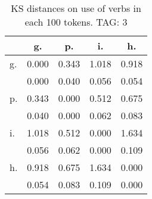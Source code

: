 \begin{table}[h!]
\begin{center}
\begin{tabular}{| l | c | c | c | c |}\hline
 & g. & p. & i. & h. \\\hline
g. & 0.000  & 0.343  & 1.018  & 0.918 \\\hline
 & 0.000  & 0.040  & 0.056  & 0.054 \\\hline
p. & 0.343  & 0.000  & 0.512  & 0.675 \\\hline
 & 0.040  & 0.000  & 0.062  & 0.083 \\\hline
i. & 1.018  & 0.512  & 0.000  & 1.634 \\\hline
 & 0.056  & 0.062  & 0.000  & 0.109 \\\hline
h. & 0.918  & 0.675  & 1.634  & 0.000 \\\hline
 & 0.054  & 0.083  & 0.109  & 0.000 \\\hline
\end{tabular}
\caption{KS distances on use of verbs in each 100 tokens. TAG: 3}
\end{center}
\end{table}
